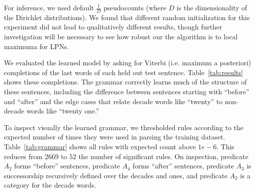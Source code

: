 \documentclass[10pt, twocolumn]{article}
\begin{document}
For inference, we used default $\frac{1}{D}$ pseudocounts (where $D$ is the
dimensionality of the Dirichlet distributions). We found that different random
initialization for this experiment did not lead to qualitatively different
results, though further investigation will be necessary to see how
robust our the algorithm is to local maximuma for LPNs.

We evaluated the learned model by asking for Viterbi (i.e. maximum a
posteriori) completions of the last words of each held out test
sentence. Table~\ref{tab:results} shows these completions. The grammar
correctly learns much of the structure of these sentences, including
the difference between sentences starting with ``before'' and
``after'' and the edge cases that relate decade words like ``twenty''
to non-decade words like ``twenty one.''

To inspect visually the learned grammar, we thresholded rules
according to the expected number of times they were used in parsing
the training dataset. Table~\ref{tab:grammar} shows all rules with
expected count above $1e-6$. This reduces from $2669$ to $52$ the
number of significant rules. On inspection, predicate $A_2$ forms
``before'' sentences, predicate $A_4$ forms ``after'' sentences,
predicate $A_3$ is successorship recursively defined over the decades
and ones, and predicate $A_2$ is a category for the decade words.
\end{document}
